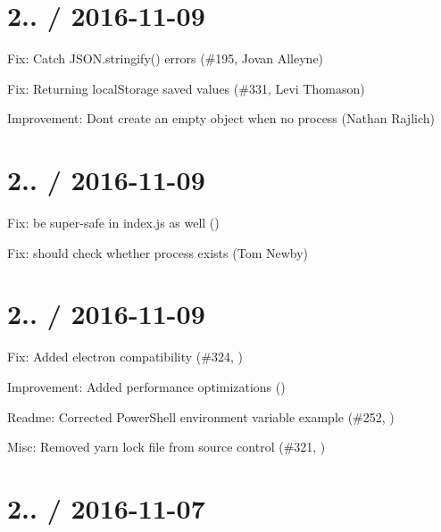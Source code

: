 \section*{2.. / 2016-\/11-\/09 }


\begin{DoxyItemize}
\item Fix\+: Catch {\ttfamily J\+S\+O\+N.\+stringify()} errors (\#195, Jovan Alleyne)
\item Fix\+: Returning {\ttfamily local\+Storage} saved values (\#331, Levi Thomason)
\item Improvement\+: Don\textquotesingle{}t create an empty object when no {\ttfamily process} (Nathan Rajlich)
\end{DoxyItemize}

\section*{2.. / 2016-\/11-\/09 }


\begin{DoxyItemize}
\item Fix\+: be super-\/safe in index.\+js as well ()
\item Fix\+: should check whether process exists (Tom Newby)
\end{DoxyItemize}

\section*{2.. / 2016-\/11-\/09 }


\begin{DoxyItemize}
\item Fix\+: Added electron compatibility (\#324, )
\item Improvement\+: Added performance optimizations ()
\item Readme\+: Corrected Power\+Shell environment variable example (\#252, )
\item Misc\+: Removed yarn lock file from source control (\#321, )
\end{DoxyItemize}

\section*{2.. / 2016-\/11-\/07 }


